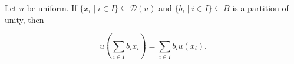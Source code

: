 Let $u$ be uniform. If $\{x_i \mid i \in I\} \subseteq \mathcal{D}(u)$ and $\{b_i \mid i \in I\} \subseteq B$ is a partition of unity, then

$$u\left(\sum_{i \in I} b_i x_i\right) = \sum_{i \in I} b_i u(x_i).$$
